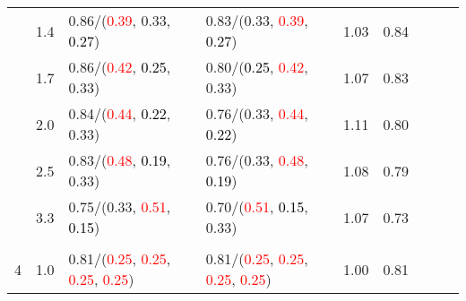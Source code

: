 \documentclass[10pt,a4paper]{report}
\begin{document}
\begin{table}[!htbp]
\begin{center}
{\begin{tabular}{ccllccccc}
				  & 1.4                               & 0.86/(\textcolor{red}{0.39}, 0.33, \textcolor{black}{0.27})                                                                                     & 0.83/(0.33, \textcolor{red}{0.39}, \textcolor{black}{0.27})                                                                                     & 1.03             & 0.84                     \\
				  & 1.7                               & 0.86/(\textcolor{red}{0.42}, \textcolor{black}{0.25}, 0.33)                                                                                     & 0.80/(\textcolor{black}{0.25}, \textcolor{red}{0.42}, 0.33)                                                                                     & 1.07             & 0.83                     \\
				  & 2.0                               & 0.84/(\textcolor{red}{0.44}, \textcolor{black}{0.22}, 0.33)                                                                                     & 0.76/(0.33, \textcolor{red}{0.44}, \textcolor{black}{0.22})                                                                                     & 1.11             & 0.80                     \\
				  & 2.5                               & 0.83/(\textcolor{red}{0.48}, \textcolor{black}{0.19}, 0.33)                                                                                     & 0.76/(0.33, \textcolor{red}{0.48}, \textcolor{black}{0.19})                                                                                     & 1.08             & 0.79                     \\
				  & 3.3                               & 0.75/(0.33, \textcolor{red}{0.51}, \textcolor{black}{0.15})                                                                                     & 0.70/(\textcolor{red}{0.51}, \textcolor{black}{0.15}, 0.33)                                                                                     & 1.07             & 0.73                     \\
				  &                                   &                                                                                                                                                 &                                                                                                                                                 &                                             \\
				4 & 1.0                               & 0.81/(\textcolor{red}{0.25}, \textcolor{red}{0.25}, \textcolor{red}{0.25}, \textcolor{red}{0.25})                                               & 0.81/(\textcolor{red}{0.25}, \textcolor{red}{0.25}, \textcolor{red}{0.25}, \textcolor{red}{0.25})                                               & 1.00             & 0.81                     \\

\end{tabular}}
\end{center}
\end{table}
\end{document}
